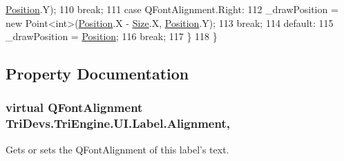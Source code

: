 \begin{DoxyCode}
      \hyperlink{class_tri_devs_1_1_tri_engine_1_1_u_i_1_1_label_af28958c2a190e348f03ee82431f072a3}{Position}.Y);
110                     \textcolor{keywordflow}{break};
111                 \textcolor{keywordflow}{case} QFontAlignment.Right:
112                     \_drawPosition = \textcolor{keyword}{new} Point<int>(\hyperlink{class_tri_devs_1_1_tri_engine_1_1_u_i_1_1_label_af28958c2a190e348f03ee82431f072a3}{Position}.X - \hyperlink{class_tri_devs_1_1_tri_engine_1_1_u_i_1_1_control_a9d5ef2f07e02300c3a2bfcef62117707}{Size}.X, 
      \hyperlink{class_tri_devs_1_1_tri_engine_1_1_u_i_1_1_label_af28958c2a190e348f03ee82431f072a3}{Position}.Y);
113                     \textcolor{keywordflow}{break};
114                 \textcolor{keywordflow}{default}:
115                     \_drawPosition = \hyperlink{class_tri_devs_1_1_tri_engine_1_1_u_i_1_1_label_af28958c2a190e348f03ee82431f072a3}{Position};
116                     \textcolor{keywordflow}{break};
117             \}
118         \}
\end{DoxyCode}


\subsection{Property Documentation}
\hypertarget{class_tri_devs_1_1_tri_engine_1_1_u_i_1_1_label_a8af3481e918b18747c57ec1502190897}{
\subsubsection[{Alignment}]{\setlength{\rightskip}{0pt plus 5cm}virtual Q\-Font\-Alignment Tri\-Devs.\-Tri\-Engine.\-U\-I.\-Label.\-Alignment\hspace{0.3cm}{\ttfamily [get]}, {\ttfamily [set]}}}\label{class_tri_devs_1_1_tri_engine_1_1_u_i_1_1_label_a8af3481e918b18747c57ec1502190897}


Gets or sets the Q\-Font\-Alignment of this label's text. 

